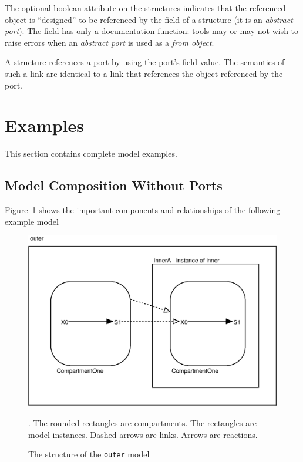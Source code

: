 \documentclass{cekarticle}
\begin{document}
The  optional boolean attribute on the  structures indicates that the referenced
object is ``designed'' to be referenced by the  field of a  structure (it is an \emph{abstract port}).
The  field has only a documentation function: tools may or may not wish to raise errors when an
\emph{abstract port} is used as a \emph{from object}.

A  structure references a port by using the port's  field value.
The semantics of such a link are identical to a link that references the object referenced by the port.

\section{Examples}
\label{sec:examples}

This section contains complete model examples.

\subsection{Model Composition Without Ports}
\label{sec:eg}

Figure~\ref{fig:eg} shows the important components and relationships of the following example model
\begin{figure}[h]
  \vspace*{8pt}
  \centering
  \includegraphics[scale = 0.7]{eg}
  \caption{The structure of the \texttt{outer} model}.
  The rounded rectangles are compartments.
  The rectangles are model instances. Dashed arrows are links.
  Arrows are reactions.
  \label{fig:eg}
\end{figure}
\end{document}
